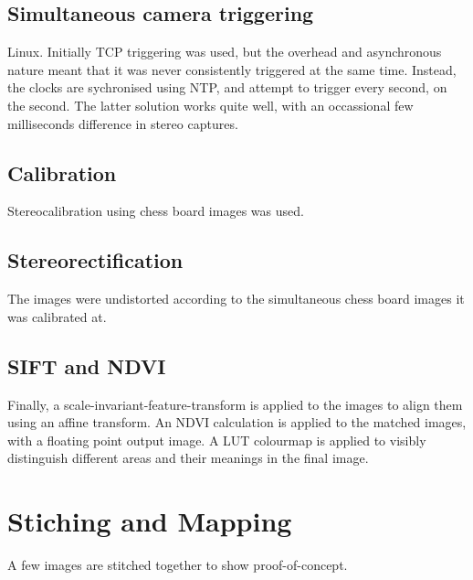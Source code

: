 \subsection{Simultaneous camera triggering}

Linux. Initially TCP triggering was used, but the overhead and asynchronous nature meant that it was never consistently triggered at the same time. Instead, the clocks are sychronised using NTP, and attempt to trigger every second, on the second. The latter solution works quite well, with an occassional few milliseconds difference in stereo captures.

\subsection{Calibration}

Stereocalibration using chess board images was used.

\subsection{Stereorectification}

The images were undistorted according to the simultaneous chess board images it was calibrated at.

\subsection{SIFT and NDVI}

Finally, a scale-invariant-feature-transform is applied to the images to align them using an affine transform. An NDVI calculation is applied to the matched images, with a floating point output image. A LUT colourmap is applied to visibly distinguish different areas and their meanings in the final image.

\section{Stiching and Mapping}

A few images are stitched together to show proof-of-concept.